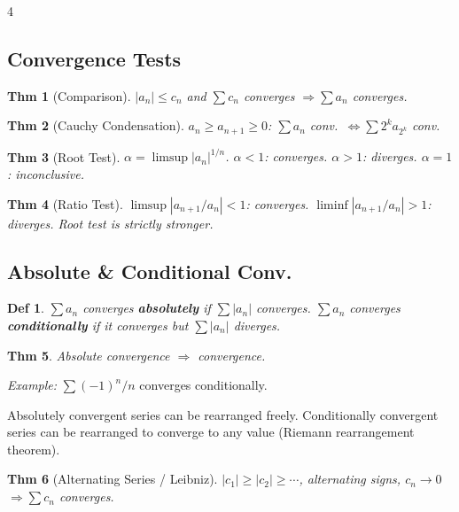 \documentclass[9pt,landscape]{extarticle}
\theoremstyle{compact}
\newtheorem*{thm}{Thm}
\theoremstyle{defnstyle}
\newtheorem*{defn}{Def}
\newenvironment{keyfact}{%
  \smallskip\noindent{\color{MidnightBlue}\bfseries Key:}\enspace\ignorespaces
}{\smallskip}
\begin{document}
\begin{multicols}{4}
\subsection{Convergence Tests}

\begin{thm}[Comparison]
$|a_n| \leq c_n$ and $\sum c_n$ converges $\Rightarrow \sum a_n$ converges.
\end{thm}

\begin{thm}[Cauchy Condensation]
$a_n \geq a_{n+1} \geq 0$: $\sum a_n$ conv.\ $\Leftrightarrow \sum 2^k a_{2^k}$ conv.
\end{thm}

\begin{thm}[Root Test]
$\alpha = \limsup |a_n|^{1/n}$. $\alpha < 1$: converges. $\alpha > 1$: diverges. $\alpha = 1$: inconclusive.
\end{thm}

\begin{thm}[Ratio Test]
$\limsup|a_{n+1}/a_n| < 1$: converges. $\liminf|a_{n+1}/a_n| > 1$: diverges. Root test is strictly stronger.
\end{thm}

\subsection{Absolute \& Conditional Conv.}
\begin{defn}
$\sum a_n$ converges \textbf{absolutely} if $\sum|a_n|$ converges.
$\sum a_n$ converges \textbf{conditionally} if it converges but $\sum|a_n|$ diverges.
\end{defn}

\begin{thm}
Absolute convergence $\Rightarrow$ convergence.
\end{thm}

\textit{Example:} $\sum (-1)^n/n$ converges conditionally.

\begin{keyfact}
Absolutely convergent series can be rearranged freely. Conditionally convergent series can be rearranged to converge to any value (Riemann rearrangement theorem).
\end{keyfact}

\begin{thm}[Alternating Series / Leibniz]
$|c_1| \geq |c_2| \geq \cdots$, alternating signs, $c_n \to 0$ $\Rightarrow \sum c_n$ converges.
\end{thm}


\end{multicols}
\end{document}
